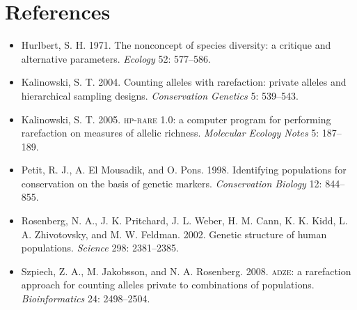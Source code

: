 \documentclass[11pt]{article}
\newcommand{\prog}{\textsc{adze}}
\begin{document}
\section*{References}

\begin{itemize}[label={},leftmargin=1.5em,itemindent=-1.5em]
\item Hurlbert, S. H. 1971. The nonconcept of species diversity: a critique and
  alternative parameters. \textit{Ecology} 52: 577--586.
\item Kalinowski, S. T. 2004. Counting alleles with rarefaction: private alleles
  and hierarchical sampling designs. \textit{Conservation Genetics} 5: 539--543.
\item Kalinowski, S. T. 2005. \textsc{hp-rare} 1.0: a computer program for
  performing rarefaction on measures of allelic richness.
  \textit{Molecular Ecology Notes} 5: 187--189.
\item Petit, R. J., A. El Mousadik, and O. Pons. 1998. Identifying populations
  for conservation on the basis of genetic markers.
  \textit{Conservation Biology} 12: 844--855.
\item Rosenberg, N. A., J. K. Pritchard, J. L. Weber, H. M. Cann, K. K. Kidd,
  L. A. Zhivotovsky, and M. W. Feldman. 2002. Genetic structure of human
  populations. \textit{Science} 298: 2381--2385.
\item Szpiech, Z. A., M. Jakobsson, and N. A. Rosenberg. 2008. \prog: a
  rarefaction approach for counting alleles private to combinations of
  populations. \textit{Bioinformatics} 24: 2498--2504.
\end{itemize}
\end{document}
